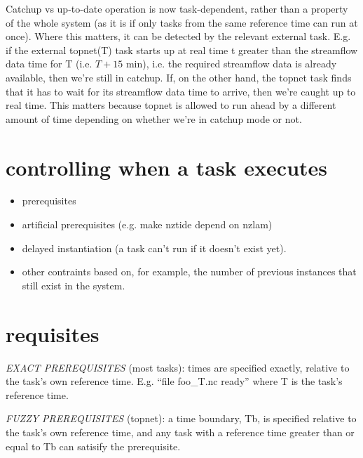 \documentclass[11pt,a4paper]{report}
\begin{document}
Catchup vs up-to-date operation is now task-dependent, rather than a
property of the whole system (as it is if only tasks from the same
reference time can run at once).  Where this matters, it can be detected
by the relevant external task. E.g. if the external topnet(T) task
starts up at real time t greater than the streamflow data time for T
(i.e. $T+15$ min), i.e. the required streamflow data is already available,
then we're still in catchup. If, on the other hand, the topnet task
finds that it has to wait for its streamflow data time to arrive, then
we're caught up to real time.  This matters because topnet is allowed to
run ahead by a different amount of time depending on whether we're in
catchup mode or not.


\section{controlling when a task executes}

\begin{itemize}
 \item  prerequisites
 \item artificial prerequisites (e.g. make nztide depend on nzlam)
 \item delayed instantiation (a task can't run if it doesn't exist yet).
 \item other contraints based on, for example, the number of previous
 instances that still exist in the system.
\end{itemize}


\section{requisites}

{\em EXACT PREREQUISITES} (most tasks): times are specified exactly,
relative to the task's own reference time.  E.g. ``file foo\_{T}.nc
ready'' where T is the task's reference time.

{\em FUZZY PREREQUISITES} (topnet): a time boundary, Tb, is specified
relative to the task's own reference time, and any task with a reference
time greater than or equal to Tb can satisify the prerequisite.
\end{document}
